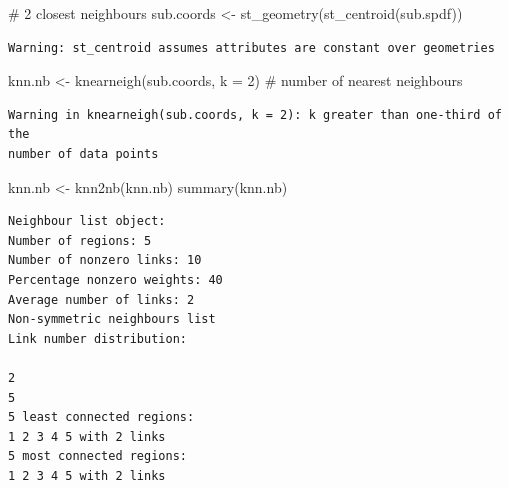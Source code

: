 \documentclass[
  letterpaper,
  DIV=11,
  numbers=noendperiod]{scrreprt}
\newenvironment{Shaded}{\begin{snugshade}}{\end{snugshade}}
\newcommand{\AttributeTok}[1]{\textcolor[rgb]{0.40,0.45,0.13}{#1}}
\newcommand{\CommentTok}[1]{\textcolor[rgb]{0.37,0.37,0.37}{#1}}
\newcommand{\DecValTok}[1]{\textcolor[rgb]{0.68,0.00,0.00}{#1}}
\newcommand{\FunctionTok}[1]{\textcolor[rgb]{0.28,0.35,0.67}{#1}}
\newcommand{\NormalTok}[1]{\textcolor[rgb]{0.00,0.23,0.31}{#1}}
\newcommand{\OtherTok}[1]{\textcolor[rgb]{0.00,0.23,0.31}{#1}}
\begin{document}
\begin{Shaded}
\begin{Highlighting}[]
\CommentTok{\# 2 closest neighbours}
\NormalTok{sub.coords }\OtherTok{\textless{}{-}} \FunctionTok{st\_geometry}\NormalTok{(}\FunctionTok{st\_centroid}\NormalTok{(sub.spdf))}
\end{Highlighting}
\end{Shaded}

\begin{verbatim}
Warning: st_centroid assumes attributes are constant over geometries
\end{verbatim}

\begin{Shaded}
\begin{Highlighting}[]
\NormalTok{knn.nb }\OtherTok{\textless{}{-}} \FunctionTok{knearneigh}\NormalTok{(sub.coords, }
                     \AttributeTok{k =} \DecValTok{2}\NormalTok{) }\CommentTok{\# number of nearest neighbours}
\end{Highlighting}
\end{Shaded}

\begin{verbatim}
Warning in knearneigh(sub.coords, k = 2): k greater than one-third of the
number of data points
\end{verbatim}

\begin{Shaded}
\begin{Highlighting}[]
\NormalTok{knn.nb }\OtherTok{\textless{}{-}} \FunctionTok{knn2nb}\NormalTok{(knn.nb)}
\FunctionTok{summary}\NormalTok{(knn.nb)}
\end{Highlighting}
\end{Shaded}

\begin{verbatim}
Neighbour list object:
Number of regions: 5 
Number of nonzero links: 10 
Percentage nonzero weights: 40 
Average number of links: 2 
Non-symmetric neighbours list
Link number distribution:

2 
5 
5 least connected regions:
1 2 3 4 5 with 2 links
5 most connected regions:
1 2 3 4 5 with 2 links
\end{verbatim}
\end{document}
